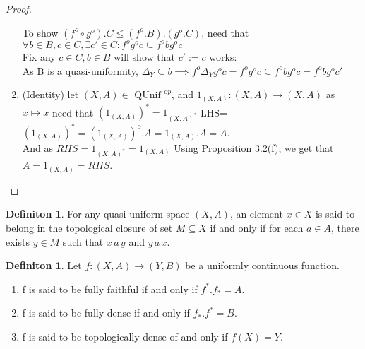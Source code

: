 \documentclass[18pt,a4paper]{article}
\theoremstyle{definition}
\newtheorem{definition}[theorem]{Definiton}
\begin{document}
\begin{proof}
\begin{enumerate}[label=(\roman*)]
			To show $(f^o \circ g^o).C\leq(f^o .B).(g^o .C)$, need that
			$\forall b \in B, c \in C, \exists c' \in C: f^o g^o c \subseteq f^obg^oc $
			\\Fix any $c\in C, b\in B$ will show that $c':=c$ works:\\
			As B is a quasi-uniformity, $\Delta_Y \subseteq b\implies f^o \Delta_Y
			g^o c=f^o g^o c \subseteq f^o b	g^o c=f^o b g^o c'$
		\item(Identity) let $(X,A)\in \text{ QUnif }^{op} $, and
			$1_{(X,A)}:(X,A)\to(X,A)$ as $x\mapsto x$ need that
			$(1_{(X,A)})^*=1_{(X,A)^*}$
			LHS=$(1_{(X,A)})^*=(1_{(X,A)})^o.A=1_{(X,A)}.A=A$. \\
			And as $RHS=1_{(X,A)^*}=1_{(X,A)}$
			Using Proposition 3.2(f), we get that $A=1_{(X,A)}=RHS$. \qedhere
	\end{enumerate}
\end{proof}
\begin{definition} %
	For any quasi-uniform space $(X,A)$, an element $x \in X$ is said to belong in the
	topological closure of set $M\subseteq X$ if and only if for each $a\in A$,
	there exists $y\in M$ such that $x\, a\, y$ and $y\, a\, x$.
\end{definition}

\begin{definition} %
	Let $f:(X,A) \to (Y,B)$ be a uniformly continuous function.
	\begin{enumerate}[label=\Roman*]
		\item f is said to be fully faithful if and only if $f^* .f_*=A$.
		\item f is said to be fully dense if and only if $f_* .f^*=B $.
		\item f is said to be topologically dense of and only if $\overline{f(X)}=Y$.
	\end{enumerate}
\end{definition}
\end{document}
